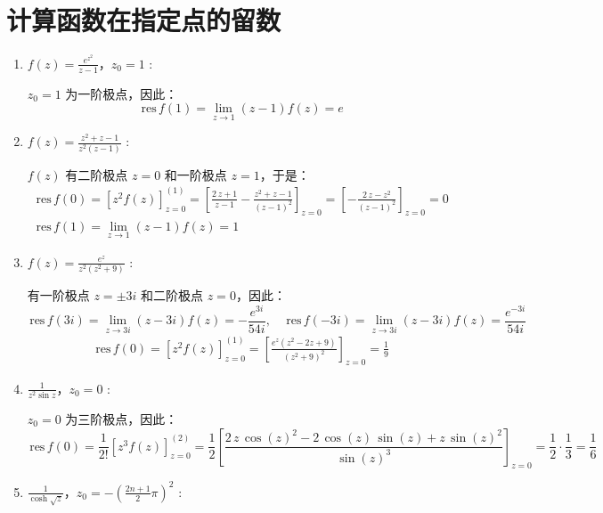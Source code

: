 \documentclass[UTF8]{report}
\def\res{\mathrm{\,res\,}}
\theoremstyle{MyLineTheoremStyle} %
\theoremstyle{MyBlockTheoremStyle} %
\theoremstyle{MySubsubsectionStyle} %
\begin{document}
\section{计算函数在指定点的留数}
\begin{enumerate}
\item $f(z) = \frac{e^{z^2}}{z - 1}$，$z_0 = 1$ :

$z_0 = 1$ 为一阶极点，因此：
\begin{equation}
    \res f(1) = \lim_{z \to 1}(z-1)f(z) = e
\end{equation}

\item $f(z) = \frac{z^2 + z -1}{z^2(z-1)}$ :

$f(z)$ 有二阶极点 $z= 0$ 和一阶极点 $z = 1$，于是：
\begin{gather}
\res f(0) = \left[z^2 f(z)\right]^{(1)}_{z = 0} = \left[\frac{2\,z+1}{z-1}-\frac{z^2 +z-1}{{{\left(z-1\right)}}^2 }\right]_{z=0}= \left[-\frac{2\,z-z^2 }{{{\left(z-1\right)}}^2 }\right]_{z=0} = 0\\ 
\res f(1) = \lim_{z \to 1} (z-1)f(z) = 1
\end{gather}

\item $f(z) = \frac{e^z}{z^2(z^2 + 9)}$ :

有一阶极点 $z = \pm 3 i$ 和二阶极点 $z= 0$，因此：
\begin{equation}
    \res f(3i) = \lim_{z \to 3i} (z-3i)f(z) = -\frac{e^{3i}}{54 i}
    ,\quad \res f(-3i) = \lim_{z \to 3i} (z-3i)f(z) = \frac{e^{-3i}}{54 i}
\end{equation}
\begin{gather}
    \res f(0) =  \left[z^2 f(z)\right]^{(1)}_{z = 0} =  \left[ \frac{e^z(z^2-2z+9)}{(z^2 + 9)^2} \right]_{z = 0} = \frac{1}{9} 
\end{gather}

\item $\frac{1}{z^2 \sin z}$，$z_0 = 0$ :

$z_0 = 0$ 为三阶极点，因此：
\begin{equation}
\res f(0) =  \frac{1}{2!}\left[z^3 f(z)\right]^{(2)}_{z = 0}
= \frac{1}{2} \left[\frac{2\,z\,{\cos \left(z\right)}^2 -2\,\cos \left(z\right)\,\sin \left(z\right)+z\,{\sin \left(z\right)}^2 }{{\sin \left(z\right)}^3 }\right]_{z = 0} = \frac{1}{2}\cdot\frac{1}{3} = \frac{1}{6}
\end{equation}

\item $\frac{1}{\cosh \sqrt{z}}$，$z_0 = -\left(\frac{2n + 1}{2} \pi\right)^2$ :


\end{enumerate}
\end{document}
